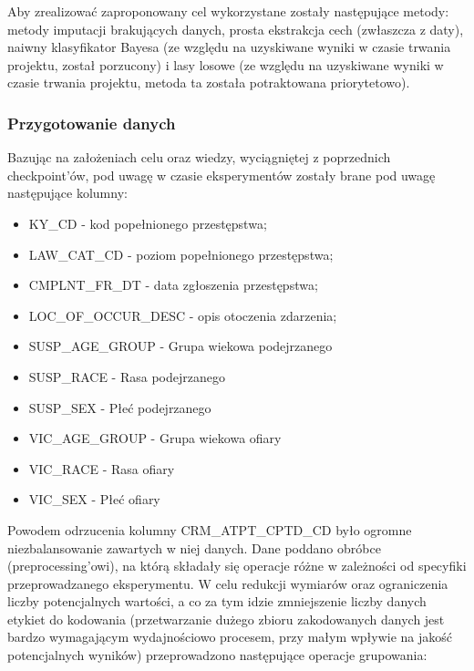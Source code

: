 \documentclass{classrep}
\begin{document}
{{{                Aby zrealizować zaproponowany cel wykorzystane zostały następujące metody:
                metody imputacji brakujących danych, prosta ekstrakcja cech (zwłaszcza z
                daty), naiwny klasyfikator Bayesa (ze względu na uzyskiwane wyniki w czasie trwania projektu, został porzucony) i lasy losowe (ze względu na uzyskiwane wyniki w czasie trwania projektu, metoda ta została potraktowana priorytetowo).

            }

            \subsubsection{Przygotowanie danych} {
                Bazując na założeniach celu oraz wiedzy, wyciągniętej z poprzednich checkpoint'ów, pod uwagę w czasie eksperymentów zostały brane pod uwagę następujące kolumny:
                \begin{itemize}
                    \item KY\_CD - kod popełnionego przestępstwa;
                    \item LAW\_CAT\_CD - poziom popełnionego przestępstwa;
                    \item CMPLNT\_FR\_DT - data zgłoszenia przestępstwa;
                    \item LOC\_OF\_OCCUR\_DESC - opis otoczenia zdarzenia;
                    \item SUSP\_AGE\_GROUP - Grupa wiekowa podejrzanego
                    \item SUSP\_RACE - Rasa podejrzanego
                    \item SUSP\_SEX - Płeć podejrzanego
                    \item VIC\_AGE\_GROUP - Grupa wiekowa ofiary
                    \item VIC\_RACE - Rasa ofiary
                    \item VIC\_SEX - Płeć ofiary
                \end{itemize}
                Powodem odrzucenia kolumny CRM\_ATPT\_CPTD\_CD było ogromne niezbalansowanie zawartych w niej danych. Dane poddano obróbce (preprocessing'owi), na którą składały się operacje różne w zależności od specyfiki przeprowadzanego eksperymentu. W celu redukcji wymiarów oraz ograniczenia liczby potencjalnych wartości, a co za tym idzie zmniejszenie liczby danych etykiet do kodowania (przetwarzanie dużego zbioru zakodowanych danych jest bardzo wymagającym wydajnościowo procesem, przy małym wpływie na jakość potencjalnych wyników) przeprowadzono następujące operacje grupowania:
}}}
\end{document}
